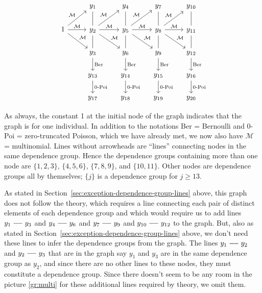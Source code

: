 \begin{equation} \label{gr:multi}
\begin{tikzcd}
  \hphantom{1} & y_1 & y_4 & y_7 & y_{10}
  \\
  1
  \arrow{r}{\mathcal{M}}
  \arrow{rd}{\mathcal{M}}
  \arrow{ru}{\mathcal{M}}
  & y_2
  \arrow[dash]{u}
  \arrow[dash]{d}
  \arrow{r}{\mathcal{M}}
  \arrow{rd}{\mathcal{M}}
  \arrow{ru}{\mathcal{M}}
  & y_5
  \arrow[dash]{u}
  \arrow[dash]{d}
  \arrow{r}{\mathcal{M}}
  \arrow{rd}{\mathcal{M}}
  \arrow{ru}{\mathcal{M}}
  & y_8
  \arrow[dash]{u}
  \arrow[dash]{d}
  \arrow{r}{\mathcal{M}}
  \arrow{rd}{\mathcal{M}}
  \arrow{ru}{\mathcal{M}}
  & y_{11}
  \arrow[dash]{u}
  \arrow[dash]{d}
  \\
  \hphantom{1} & y_3 \arrow{d}{\text{Ber}} & y_6 \arrow{d}{\text{Ber}}
  & y_9 \arrow{d}{\text{Ber}} & y_{12} \arrow{d}{\text{Ber}}
  \\
  \hphantom{1} & y_{13} \arrow{d}{\text{0-Poi}}
  & y_{14} \arrow{d}{\text{0-Poi}}
  & y_{15} \arrow{d}{\text{0-Poi}} & y_{16} \arrow{d}{\text{0-Poi}}
  \\
  \hphantom{1} & y_{17} & y_{18} & y_{19} & y_{20}
\end{tikzcd}
\end{equation}

As always, the constant 1 at the initial node
of the graph indicates that the graph is for one individual.
In addition to the notations Ber = Bernoulli
and 0-Poi = zero-truncated Poisson, which we have already met,
we now also have $\mathcal{M}$ = multinomial.
Lines without arrowheads are ``lines'' connecting nodes in the
same dependence group.  Hence the dependence groups containing more than
one node are $\{1, 2, 3\}$, $\{4, 5, 6\}$, $\{7, 8, 9\}$, and $\{10, 11\}$.
Other nodes are dependence groups all by themselves; $\{j\}$ is a dependence
group for $j \ge 13$.

As stated in Section~\ref{sec:exception-dependence-group-lines} above,
this graph does not follow the theory, which requires a line connecting
each pair of distinct elements of each dependence group and which would
require us to add lines $y_1 \myline y_3$ and $y_4 \myline y_6$
and $y_7 \myline y_9$ and $y_{10} \myline y_{12}$ to the graph.
But, also as stated in Section~\ref{sec:exception-dependence-group-lines}
above, we don't need these lines to infer the dependence groups from the
graph.  The lines $y_1 \myline y_2$ and $y_2 \myline y_3$ that are in the
graph say $y_1$ and $y_3$ are in the same dependence group as $y_2$,
and since there are no other lines to these nodes, they must constitute
a dependence group.  Since there doesn't seem to be any room in
the picture \eqref{gr:multi} for these additional lines required by theory,
we omit them.

